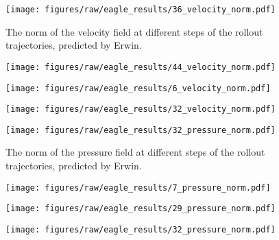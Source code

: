 \clearpage
\begin{figure*}
\caption{The norm of the velocity field at different steps of the rollout trajectories, predicted by Erwin.}
\label{appendix:velocity}
\vspace{30pt}
    \centering
    \texttt{[image: figures/raw/eagle\_results/36\_velocity\_norm.pdf]}
\end{figure*}

\begin{figure*}
    \centering
    \texttt{[image: figures/raw/eagle\_results/44\_velocity\_norm.pdf]}
\end{figure*}

\begin{figure*}
    \centering
    \texttt{[image: figures/raw/eagle\_results/6\_velocity\_norm.pdf]}
\end{figure*}

\begin{figure*}
    \centering
    \texttt{[image: figures/raw/eagle\_results/32\_velocity\_norm.pdf]}
\end{figure*}

\begin{figure*}
\caption{The norm of the pressure field at different steps of the rollout trajectories, predicted by Erwin.}
\label{appendix:pressure}
\vspace{30pt}
    \centering
    \texttt{[image: figures/raw/eagle\_results/32\_pressure\_norm.pdf]}
\end{figure*}

\begin{figure*}
    \centering
    \texttt{[image: figures/raw/eagle\_results/7\_pressure\_norm.pdf]}
\end{figure*}

\begin{figure*}
    \centering
    \texttt{[image: figures/raw/eagle\_results/29\_pressure\_norm.pdf]}
\end{figure*}

\begin{figure*}
    \centering
    \texttt{[image: figures/raw/eagle\_results/32\_pressure\_norm.pdf]}
\end{figure*}
